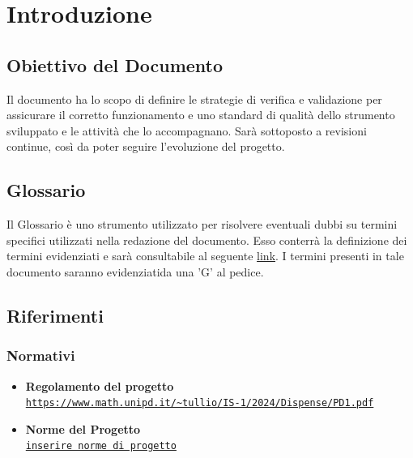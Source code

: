 \documentclass{article}
\begin{document}
\section{Introduzione}
\subsection{Obiettivo del Documento}
Il documento ha lo scopo di definire le strategie di verifica e validazione per assicurare il corretto funzionamento e uno standard di qualità
dello strumento sviluppato e le attività che lo accompagnano. Sarà sottoposto a revisioni continue, così da poter seguire l'evoluzione del progetto.

\subsection{Glossario}
Il Glossario è uno strumento utilizzato per risolvere eventuali dubbi su termini specifici utilizzati nella redazione del documento. Esso conterrà la definizione dei 
termini evidenziati e sarà consultabile al seguente \href{https://code7crusaders.github.io/docs/RTB/documentazione_interna/glossario.html}{link}. I termini presenti in tale documento
saranno evidenziatida una 'G' al pedice.

\subsection{Riferimenti}
\subsubsection{Normativi}
\begin{itemize}
    \item \textbf{Regolamento del progetto} \\ \texttt{\url{https://www.math.unipd.it/~tullio/IS-1/2024/Dispense/PD1.pdf}}
    \item \textbf{{Norme del Progetto}} \\ \texttt{\url{inserire norme di progetto}}
\end{itemize}
\end{document}
